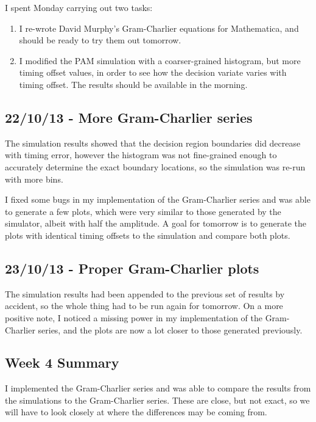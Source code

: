 I spent Monday carrying out two tasks:

\begin{enumerate}
\def\labelenumi{\arabic{enumi}.}
\itemsep1pt\parskip0pt
\item
  I re-wrote David Murphy's Gram-Charlier equations for Mathematica, and should be ready to try
  them out tomorrow.
\item
  I modified the PAM simulation with a coarser-grained histogram, but
  more timing offset values, in order to see how the decision variate
  varies with timing offset. The results should be available in the
  morning.
\end{enumerate}

\subsection{22/10/13 - More Gram-Charlier series}

The simulation results showed that the decision region boundaries did
decrease with timing error, however the histogram was not fine-grained
enough to accurately determine the exact boundary locations, so the
simulation was re-run with more bins.

I fixed some bugs in my implementation of the Gram-Charlier series and
was able to generate a few plots, which were very similar to those
generated by the simulator, albeit with half the amplitude. A goal for
tomorrow is to generate the plots with identical timing offsets to the
simulation and compare both plots.

\subsection{23/10/13 - Proper Gram-Charlier plots}

The simulation results had been appended to the previous set of results
by accident, so the whole thing had to be run again for tomorrow. On a
more positive note, I noticed a missing power in my implementation of
the Gram-Charlier series, and the plots are now a lot closer to those
generated previously.

\subsection{Week 4 Summary}

I implemented the Gram-Charlier series and was able to compare the
results from the simulations to the Gram-Charlier series. These are
close, but not exact, so we will have to look closely at where the
differences may be coming from.

